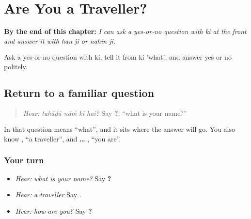 
\chapter{Are You a Traveller?}
\label{ch:pa-a2-polar}

\begin{chapteropening}
\textbf{By the end of this chapter:} \emph{I can ask a yes-or-no question with ki at the front and answer it with han ji or nahin ji.}

Ask a yes-or-no question with ki, tell it from ki 'what', and answer yes or no politely.
\end{chapteropening}

\section[\texorpdfstring{\pa{ਤੁਹਾਡਾ} \pa{ਨਾਂ} \pa{ਕੀ} \pa{ਹੈ}? … (tuhāḍā nāṁ kī …)}{ਤੁਹਾਡਾ ਨਾਂ ਕੀ ਹੈ? … (tuhāḍā nāṁ kī …)}]{Return to a familiar question}

\label{lesson:PA-C214-ki-return}



\begin{quote}
\emph{Hear:} \emph{tuhāḍā nāṁ kī hai?} Say \textbf{   ?}, \textquotedblleft{}what is your name?\textquotedblright{}
\end{quote}

\begin{grammarlens}[title={Grammar Lens}]
In that question \textbf{} means \textquotedblleft{}what\textquotedblright{}, and it sits where the answer will go. You also know \textbf{}, \textquotedblleft{}a traveller\textquotedblright{}, and \textbf{ … }, \textquotedblleft{}you are\textquotedblright{}.
\end{grammarlens}

\subsection*{Your turn}
\begin{itemize}
\raggedright
  \item \emph{Hear:} \emph{what is your name?} Say \textbf{   ?}
  \item \emph{Hear:} \emph{a traveller} Say \textbf{}.
  \item \emph{Hear:} \emph{how are you?} Say \textbf{  ?}
\end{itemize}

